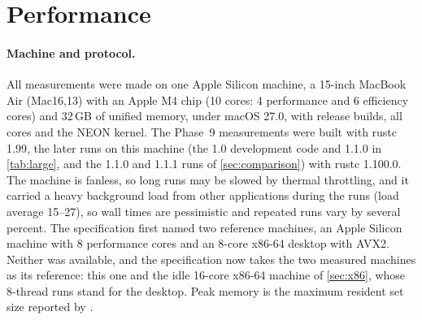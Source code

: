 
\section{Performance}
\label{sec:performance}

\paragraph{Machine and protocol.}
All measurements were made on one Apple Silicon machine, a 15-inch MacBook
Air (Mac16,13) with an Apple M4 chip (10 cores: 4 performance and 6
efficiency cores) and 32\,GB of unified memory, under macOS 27.0, with
release builds, all cores and the NEON kernel. The Phase~9 measurements were
built with rustc 1.99, the later runs on this machine (the 1.0
development code and 1.1.0 in \cref{tab:large}, and the 1.1.0 and 1.1.1
runs of \cref{sec:comparison}) with rustc 1.100.0. The machine is fanless, so long
runs may be slowed by thermal throttling, and it carried a heavy background
load from other applications during the runs (load average 15--27), so wall
times are pessimistic and repeated runs vary by several percent. The
specification first named two reference machines, an Apple Silicon machine
with 8 performance cores and an 8-core x86-64 desktop with AVX2. Neither was
available, and the specification now takes the two measured machines as its
reference: this one and the idle 16-core x86-64 machine of \cref{sec:x86},
whose 8-thread runs stand for the desktop. Peak
memory is the maximum resident set size reported by .

